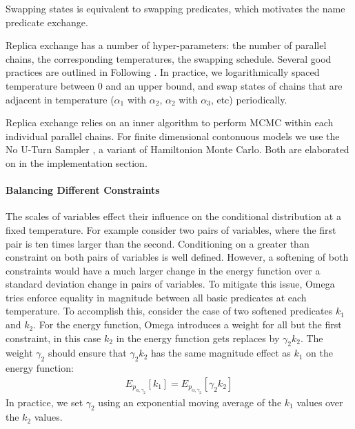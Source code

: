 Swapping states is equivalent to swapping predicates, which motivates the name predicate exchange.

Replica exchange has a number of hyper-parameters: the number of parallel chains, the corresponding temperatures, the swapping schedule.
Several good practices are outlined in Following \cite{earl2005parallel}.  In practice, we logarithmically spaced temperature between $0$ and an upper bound, and swap states of chains that are adjacent in temperature ($\alpha_1$ with $\alpha_2$, $\alpha_2$ with $\alpha_3$, etc) periodically.

Replica exchange relies on an inner algorithm to perform MCMC within each individual parallel chains.
For finite dimensional contonuous models we use the No U-Turn Sampler \cite{hoffman2014no}, a variant of Hamiltonion Monte Carlo.
Both are elaborated on in the implementation section.



\paragraph{Balancing Different Constraints}
The scales of variables effect their influence on
the conditional distribution at a fixed temperature.
For example consider two pairs of variables, where
the first pair is ten times larger than the second.
Conditioning on a greater than constraint on both
pairs of variables is well defined. However,
a softening of both constraints would have 
a much larger change in the energy function over
a standard deviation change in pairs of variables.
To mitigate this issue, Omega tries enforce equality
in magnitude between all basic predicates at each temperature.
To accomplish this, consider the case of two 
softened predicates $k_1$ and $k_2$. For the
energy function, Omega introduces a weight
for all but the first constraint, in this
case $k_2$ in the energy function gets replaces
by $\gamma_2 k_2$. The weight $\gamma_2$ should
ensure that $\gamma_2 k_2$ has the same
magnitude effect as $k_1$ on the energy
function:
\begin{align*}
E_{p_{\alpha, \gamma_2}}[k_1] = E_{p_{\alpha, \gamma_2}}[\gamma_2 k_2] 
\end{align*}
In practice, we set $\gamma_2$ using an exponential moving
average of the $k_1$ values over the $k_2$ values.

